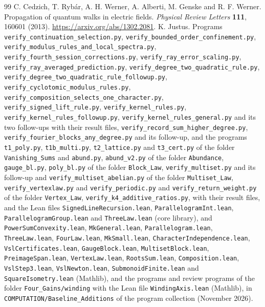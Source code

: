 \documentclass[11pt,a4paper]{article}
\begin{document}
\setcounter{page}{2}

\clearpage
\begin{thebibliography}{99}
 C. Cedzich, T. Ryb\'ar, A. H. Werner, A. Alberti, M. Genske and R. F. Werner. Propagation of quantum walks in electric fields. \emph{Physical Review Letters} \textbf{111}, 160601 (2013). \url{https://arxiv.org/abs/1302.2081}.
 K. Justus. Programs \texttt{verify\_continuation\_selection.py}, \texttt{verify\_bounded\_order\_confinement.py}, \texttt{verify\_modulus\_rules\_and\_local\_spectra.py}, \texttt{verify\_fourth\_session\_corrections.py}, \texttt{verify\_ray\_error\_scaling.py}, \texttt{verify\_ray\_averaged\_prediction.py}, \texttt{verify\_degree\_two\_quadratic\_rule.py}, \texttt{verify\_degree\_two\_quadratic\_rule\_followup.py}, \texttt{verify\_cyclotomic\_modulus\_rules.py}, \texttt{verify\_composition\_selects\_one\_character.py}, \texttt{verify\_signed\_lift\_rule.py}, \texttt{verify\_kernel\_rules.py}, \texttt{verify\_kernel\_rules\_followup.py}, \texttt{verify\_kernel\_rules\_general.py} and its two follow-ups with their result files, \texttt{verify\_record\_sum\_higher\_degree.py}, \texttt{verify\_fourier\_blocks\_any\_degree.py} and its follow-up, and the programs \texttt{t1\_poly.py}, \texttt{t1b\_multi.py}, \texttt{t2\_lattice.py} and \texttt{t3\_cert.py} of the folder \texttt{Vanishing\_Sums} and \texttt{abund.py}, \texttt{abund\_v2.py} of the folder \texttt{Abundance}, \texttt{gauge\_bl.py}, \texttt{poly\_bl.py} of the folder \texttt{Block\_Law}, \texttt{verify\_multiset.py} and its follow-up and \texttt{verify\_multiset\_abelian.py} of the folder \texttt{Multiset\_Law}, \texttt{verify\_vertexlaw.py} and \texttt{verify\_periodic.py} and \texttt{verify\_return\_weight.py} of the folder \texttt{Vertex\_Law}, \texttt{verify\_k4\_additive\_ratios.py}, with their result files, and the Lean files \texttt{SignedLineRecursion.lean}, \texttt{ParallelogramInt.lean}, \texttt{ParallelogramGroup.lean} and \texttt{ThreeLaw.lean} (core library), and \texttt{PowerSumConvexity.lean}, \texttt{MkGeneral.lean}, \texttt{Parallelogram.lean}, \texttt{ThreeLaw.lean}, \texttt{FourLaw.lean}, \texttt{MkSmall.lean}, \texttt{CharacterIndependence.lean}, \texttt{VslCertificates.lean}, \texttt{GaugeBlock.lean}, \texttt{MultisetBlock.lean}, \texttt{PreimageSpan.lean}, \texttt{VertexLaw.lean}, \texttt{RootsSum.lean}, \texttt{Composition.lean}, \texttt{VslStep3.lean}, \texttt{VslNewton.lean}, \texttt{SubmonoidFinite.lean} and \texttt{SquareIsometry.lean} (Mathlib), and the programs and review programs of the folder \texttt{Four\_Gains/winding} with the Lean file \texttt{WindingAxis.lean} (Mathlib), in \texttt{COMPUTATION/Baseline\_Additions} of the program collection (November 2026).

\end{thebibliography}
\end{document}
